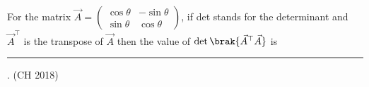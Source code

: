 \item For the matrix $\vec{A} = \begin{pmatrix} \cos\theta & -\sin\theta \\ \sin\theta & \cos\theta \end{pmatrix}$, if det stands for the determinant and $\vec{A}^{\top}$ is the transpose of $\vec{A}$ then the value of $\det\brak{\vec{A}^{\top}\vec{A}}$ is \rule{1cm}{0.01pt}.
		\hfill(CH 2018)

